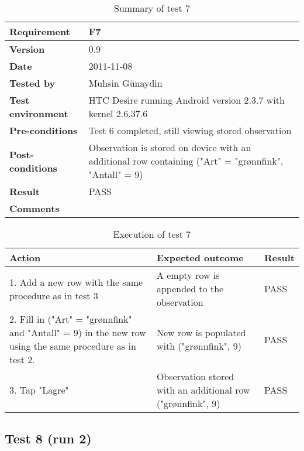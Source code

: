 	\begin{table}[htb]
		\centering
		\begin{tabular}{|p{3.5cm}|p{7.0cm}|} \hline
			\textbf{Requirement} & F7 \\ \hline
			\textbf{Version} & 0.9 \\ \hline
			\textbf{Date} & 2011-11-08 \\ \hline
			\textbf{Tested by} & Muhsin Günaydin \\ \hline
			\textbf{Test environment} & HTC Desire running Android version 2.3.7 with kernel 2.6.37.6 \\ \hline
			\textbf{Pre-conditions} & Test 6 completed, still viewing stored observation \\ \hline
			\textbf{Post-conditions} & Observation is stored on device with an additional row containing ("Art" = "grønnfink", "Antall" = 9) \\ \hline
			\textbf{Result} & PASS \\ \hline
			\textbf{Comments} & \\ \hline
		\end{tabular}
		\caption{Summary of test 7}
	\end{table}

	\begin{table}[htb]
		\centering
		\begin{tabular}{|p{5.0cm}|p{5.0cm}|p{1cm}|}
			\hline \textbf{Action} & \textbf{Expected outcome} & \textbf{Result} \\ \hline

			1. Add a new row with the same procedure as in test 3 &
			A empty row is appended to the observation &
			PASS \\ \hline

			2. Fill in ("Art" = "grønnfink" and "Antall" = 9) in the new row
			using the same procedure as in test 2. &
			New row is populated with ("grønnfink", 9) &
			PASS \\ \hline

			3. Tap "Lagre" &
			Observation stored with an additional row ("grønnfink", 9) &
			PASS \\ \hline

		\end{tabular}
		\caption{Execution of test 7}
	\end{table}

\newpage
\subsection*{Test 8 (run 2)}

